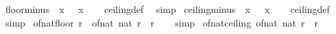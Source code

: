 \begin{isabellebody}
\endisatagproof
{\isafoldproof}%
%
\isadelimproof
%
\endisadelimproof
%
\isadelimdocument
%
\endisadelimdocument
%
\isatagdocument
%
\isamarkuptrue%
%
\endisatagdocument
{\isafolddocument}%
%
\isadelimdocument
%
\endisadelimdocument
{}\isamarkupfalse%
\ floor{\isacharunderscore}{\kern0pt}minus{\isacharcolon}{\kern0pt}\ {\isachardoublequoteopen}{\isasymlfloor}{\isacharminus}{\kern0pt}\ x{\isasymrfloor}\ {\isacharequal}{\kern0pt}\ {\isacharminus}{\kern0pt}\ {\isasymlceil}x{\isasymrceil}{\isachardoublequoteclose}\isanewline
%
\isadelimproof
\ \ %
\endisadelimproof
%
\isatagproof
{}\isamarkupfalse%
\ ceiling{\isacharunderscore}{\kern0pt}def\ \isamarkupfalse%
\ simp%
\endisatagproof
{\isafoldproof}%
%
\isadelimproof
\isanewline
%
\endisadelimproof
\isanewline
{}\isamarkupfalse%
\ ceiling{\isacharunderscore}{\kern0pt}minus{\isacharcolon}{\kern0pt}\ {\isachardoublequoteopen}{\isasymlceil}{\isacharminus}{\kern0pt}\ x{\isasymrceil}\ {\isacharequal}{\kern0pt}\ {\isacharminus}{\kern0pt}\ {\isasymlfloor}x{\isasymrfloor}{\isachardoublequoteclose}\isanewline
%
\isadelimproof
\ \ %
\endisadelimproof
%
\isatagproof
{}\isamarkupfalse%
\ ceiling{\isacharunderscore}{\kern0pt}def\ \isamarkupfalse%
\ simp%
\endisatagproof
{\isafoldproof}%
%
\isadelimproof
%
\endisadelimproof
%
\isadelimdocument
%
\endisadelimdocument
%
\isatagdocument
%
\isamarkuptrue%
%
\endisatagdocument
{\isafolddocument}%
%
\isadelimdocument
%
\endisadelimdocument
{}\isamarkupfalse%
\ of{\isacharunderscore}{\kern0pt}nat{\isacharunderscore}{\kern0pt}floor{\isacharcolon}{\kern0pt}\ {\isachardoublequoteopen}r{\isasymge}{}\ {\isasymLongrightarrow}\ of{\isacharunderscore}{\kern0pt}nat\ {\isacharparenleft}{\kern0pt}nat\ {\isasymlfloor}r{\isasymrfloor}{\isacharparenright}{\kern0pt}\ {\isasymle}\ r{\isachardoublequoteclose}\isanewline
%
\isadelimproof
\ \ %
\endisadelimproof
%
\isatagproof
{}\isamarkupfalse%
\ simp%
\endisatagproof
{\isafoldproof}%
%
\isadelimproof
\isanewline
%
\endisadelimproof
\isanewline
{}\isamarkupfalse%
\ of{\isacharunderscore}{\kern0pt}nat{\isacharunderscore}{\kern0pt}ceiling{\isacharcolon}{\kern0pt}\ {\isachardoublequoteopen}of{\isacharunderscore}{\kern0pt}nat\ {\isacharparenleft}{\kern0pt}nat\ {\isasymlceil}r{\isasymrceil}{\isacharparenright}{\kern0pt}\ {\isasymge}\ r{\isachardoublequoteclose}\isanewline
%
\isadelimproof
\ \ %
\endisadelimproof
%
\isatagproof

\end{isabellebody}
